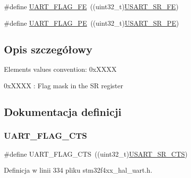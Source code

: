 \begin{DoxyCompactItemize}
\item 
\#define \hyperlink{group___u_a_r_t___flags_gafba4891ce21cf5223ca5fede0eac388d}{U\+A\+R\+T\+\_\+\+F\+L\+A\+G\+\_\+\+FE}~((uint32\+\_\+t)\hyperlink{group___peripheral___registers___bits___definition_ga9eb6fd3f820bd12e0b5a981de1894804}{U\+S\+A\+R\+T\+\_\+\+S\+R\+\_\+\+FE})
\item 
\#define \hyperlink{group___u_a_r_t___flags_gad5b96f73f6d3a0b58f07e2e9d7bf14d9}{U\+A\+R\+T\+\_\+\+F\+L\+A\+G\+\_\+\+PE}~((uint32\+\_\+t)\hyperlink{group___peripheral___registers___bits___definition_gac88be3484245af8c1b271ae5c1b97a14}{U\+S\+A\+R\+T\+\_\+\+S\+R\+\_\+\+PE})
\end{DoxyCompactItemize}


\subsection{Opis szczegółowy}
Elements values convention\+: 0x\+X\+X\+XX
\begin{DoxyItemize}
\item 0x\+X\+X\+XX \+: Flag mask in the SR register 
\end{DoxyItemize}

\subsection{Dokumentacja definicji}
\mbox{\label{group___u_a_r_t___flags_ga5435edd22ff23de7187654362c48e0b1}} 
\subsubsection{\texorpdfstring{U\+A\+R\+T\+\_\+\+F\+L\+A\+G\+\_\+\+C\+TS}{UART\_FLAG\_CTS}}
{\footnotesize\ttfamily \#define U\+A\+R\+T\+\_\+\+F\+L\+A\+G\+\_\+\+C\+TS~((uint32\+\_\+t)\hyperlink{group___peripheral___registers___bits___definition_ga9250ae2793db0541e6c4bb8837424541}{U\+S\+A\+R\+T\+\_\+\+S\+R\+\_\+\+C\+TS})}



Definicja w linii 334 pliku stm32f4xx\+\_\+hal\+\_\+uart.\+h.

\mbox{\label{group___u_a_r_t___flags_gafba4891ce21cf5223ca5fede0eac388d}} 

